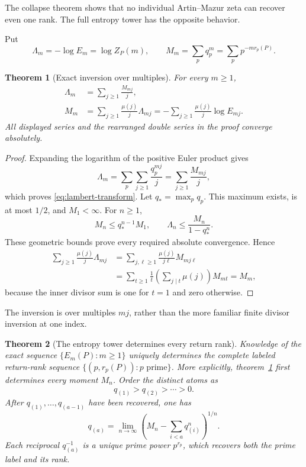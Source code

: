 \documentclass[11pt]{article}
\numberwithin{equation}{section}
\newtheorem{theorem}{Theorem}[section]
\theoremstyle{remark}
\begin{document}
The collapse theorem shows that no individual Artin--Mazur zeta can recover
even one rank.  The full entropy tower has the opposite behavior.

Put
\begin{equation}
 \Lambda_m=-\log E_m=\log Z_P(m),
 \qquad
 M_m=\sum_p q_p^m=\sum_p p^{-m r_p(P)}.
 \label{eq:lambda-moment}
\end{equation}

\begin{theorem}[Exact inversion over multiples]
\label{thm:mobius}
For every $m\ge1$,
\begin{align}
 \Lambda_m
 &=\sum_{j\ge1}\frac{M_{mj}}j,
 \label{eq:lambert-transform}\\
 M_m
 &=\sum_{j\ge1}\frac{\mu(j)}j\Lambda_{mj}
 =-\sum_{j\ge1}\frac{\mu(j)}j\log E_{mj}.
 \label{eq:mobius-inversion}
\end{align}
All displayed series and the rearranged double series in the proof converge
absolutely.
\end{theorem}

\begin{proof}
Expanding the logarithm of the positive Euler product gives
\[
 \Lambda_m
 =\sum_p\sum_{j\ge1}\frac{q_p^{mj}}j
 =\sum_{j\ge1}\frac{M_{mj}}j,
\]
which proves \eqref{eq:lambert-transform}.  Let
$q_*=\max_p q_p$.  This maximum exists, is at most $1/2$, and
$M_1<\infty$.  For $n\ge1$,
\begin{equation}
 M_n\le q_*^{n-1}M_1,
 \qquad
 \Lambda_n\le\frac{M_n}{1-q_*^n}.
 \label{eq:absolute-bounds}
\end{equation}
These geometric bounds prove every required absolute convergence.  Hence
\begin{align*}
 \sum_{j\ge1}\frac{\mu(j)}j\Lambda_{mj}
 &=\sum_{j,\ell\ge1}\frac{\mu(j)}{j\ell}M_{mj\ell}\\
 &=\sum_{t\ge1}\frac1t
   \left(\sum_{j\mid t}\mu(j)\right)M_{mt}
 =M_m,
\end{align*}
because the inner divisor sum is one for $t=1$ and zero otherwise.
\end{proof}

The inversion is over multiples $mj$, rather than the more familiar
finite divisor inversion at one index.

\begin{theorem}[The entropy tower determines every return rank]
\label{thm:rank-recovery}
Knowledge of the exact sequence $\{E_m(P):m\ge1\}$ uniquely determines
the complete labeled return-rank sequence
$\{(p,r_p(P)):p\text{ prime}\}$.
More explicitly, theorem~\ref{thm:mobius} first determines every moment
$M_n$.  Order the distinct atoms as
\[
 q_{(1)}>q_{(2)}>\cdots>0.
\]
After $q_{(1)},\ldots,q_{(a-1)}$ have been recovered, one has
\begin{equation}
 q_{(a)}
 =\lim_{n\to\infty}
 \left(M_n-\sum_{i<a}q_{(i)}^n\right)^{1/n}.
 \label{eq:moment-peeling}
\end{equation}
Each reciprocal $q_{(a)}^{-1}$ is a unique prime power $p^{r_p}$, which
recovers both the prime label and its rank.
\end{theorem}
\end{document}
